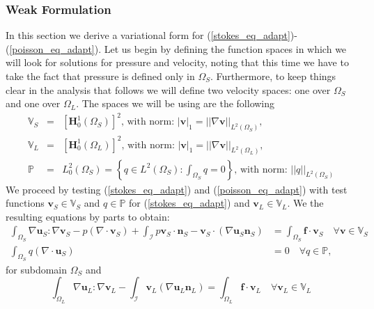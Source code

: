 \documentclass[12pt,a4paper]{article}
\theoremstyle{definition}
\begin{document}
\subsubsection{Weak Formulation}
In this section we derive a variational form for (\ref{stokes_eq_adapt})-(\ref{poisson_eq_adapt}).  Let us begin by defining the function spaces in which we will look for solutions for pressure and velocity, noting that this time we have to take the fact that pressure is defined only in $\Omega_S$.  Furthermore, to keep things clear in the analysis that follows we will define two velocity spaces: one over $\Omega_S$ and one over $\Omega_L$.  The spaces we will be using are the following
\begin{eqnarray}\label{fspace_V1}
\mathbb{V}_S&=&\left[\textbf{H}^1_0\left(\Omega_S\right)\right]^2\text{, with norm: } \left|\textbf{v}\right|_{1}=\left|\left|\nabla\textbf{v}\right|\right|_{L^2\left(\Omega_S\right)}, \\ \label{fspace_V2}
\mathbb{V}_L&=&\left[\textbf{H}^1_0\left(\Omega_L\right)\right]^2\text{, with norm: } \left|\textbf{v}\right|_{1}=\left|\left|\nabla\textbf{v}\right|\right|_{L^2\left(\Omega_L\right)}, \\\label{fspace_P1}
\mathbb{P}&=&L^2_0\left(\Omega_S\right)=\left\lbrace q\in L^2\left(\Omega_S\right): \int_{\Omega_S} q=0\right\rbrace\text{, with norm: } \left|\left|q\right|\right|_{L^2\left(\Omega_S\right)}
\end{eqnarray}
We proceed by testing (\ref{stokes_eq_adapt}) and (\ref{poisson_eq_adapt}) with test functions $\textbf{v}_S\in \mathbb{V}_S$ and $q\in \mathbb{P}$ for (\ref{stokes_eq_adapt}) and $\textbf{v}_L\in\mathbb{V}_L$. We the resulting equations by parts to obtain:
\begin{equation}\label{weak_stokes_1}
\begin{aligned}
\int_{\Omega_S}\nabla \textbf{u}_S : \nabla \textbf{v}_S-p\left(\nabla \cdot \textbf{v}_S\right) +\int_{\mathcal{I}} p\textbf{v}_S\cdot \textbf{n}_S-\textbf{v}_S\cdot\left(\nabla\textbf{u}_S\textbf{n}_S\right) &=\int_{\Omega_S}\textbf{f}\cdot \textbf{v}_S  \quad \forall  \textbf{v}\in \mathbb{V}_S\\
\int_{\Omega_S}q\left(\nabla \cdot \textbf{u}_S\right) &= 0\quad \forall q\in \mathbb{P},
\end{aligned}
\end{equation}
for subdomain $\Omega_S$ and
\begin{equation}\label{weak_poisson}
\int_{\Omega_L}\nabla \textbf{u}_L : \nabla \textbf{v}_L - \int_{\mathcal{I}} \textbf{v}_L \left(\nabla\textbf{u}_L\textbf{n}_L\right)= 
\int_{\Omega_L}\textbf{f}\cdot \textbf{v}_L  \quad \forall  \textbf{v}_L\in \mathbb{V}_L
\end{equation}
\end{document}
